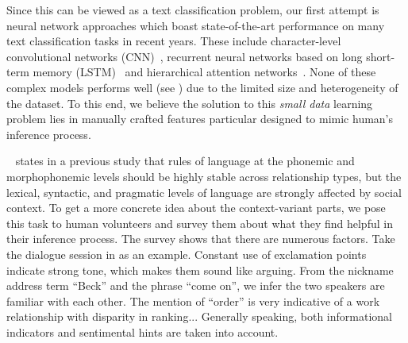 Since this can be viewed as a text classification problem, our first attempt is
neural network approaches which boast state-of-the-art performance on many text classification tasks in recent years. These
include character-level convolutional networks (CNN)~\cite{cnn}, 
recurrent neural networks based on long short-term memory (LSTM)~\cite{lstm} 
and hierarchical attention networks~\cite{hierarchy}. 
None of these complex models performs well (see ) due to the limited size and 
heterogeneity of the dataset. 
To this end, we believe the solution to this {\em small data} learning problem
lies in manually crafted features particular designed to mimic human's 
inference process. 

\citeauthor{flover}~ states in a previous study that rules of 
language at the phonemic and morphophonemic levels should be highly stable across 
relationship types, but the lexical, syntactic, and pragmatic levels of language are 
strongly affected by social context. To get a more concrete idea about the 
context-variant parts, we pose this task to human volunteers and 
survey them about 
what they find helpful in their inference process. 
The survey shows that there are numerous factors. 
Take the dialogue session in  as an example.
Constant use of exclamation points indicate strong tone, 
which makes them sound like arguing.
From the nickname address term ``Beck'' and the phrase ``come on'', 
we infer the two speakers are familiar with each other. 
The mention of ``order'' is very indicative of a work relationship with 
disparity in ranking... 
Generally speaking, both informational indicators and sentimental 
hints are taken into account.


